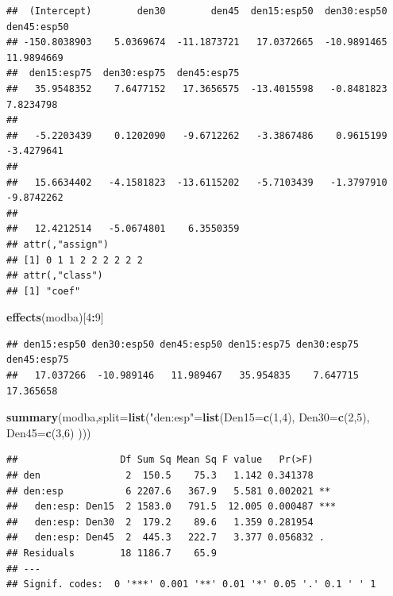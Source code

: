\documentclass[
]{book}
\newenvironment{Shaded}{\begin{snugshade}}{\end{snugshade}}
\newcommand{\DataTypeTok}[1]{\textcolor[rgb]{0.13,0.29,0.53}{#1}}
\newcommand{\DecValTok}[1]{\textcolor[rgb]{0.00,0.00,0.81}{#1}}
\newcommand{\KeywordTok}[1]{\textcolor[rgb]{0.13,0.29,0.53}{\textbf{#1}}}
\newcommand{\NormalTok}[1]{#1}
\newcommand{\OperatorTok}[1]{\textcolor[rgb]{0.81,0.36,0.00}{\textbf{#1}}}
\newcommand{\StringTok}[1]{\textcolor[rgb]{0.31,0.60,0.02}{#1}}
\begin{document}
\begin{verbatim}
##  (Intercept)        den30        den45  den15:esp50  den30:esp50  den45:esp50 
## -150.8038903    5.0369674  -11.1873721   17.0372665  -10.9891465   11.9894669 
##  den15:esp75  den30:esp75  den45:esp75                                        
##   35.9548352    7.6477152   17.3656575  -13.4015598   -0.8481823    7.8234798 
##                                                                               
##   -5.2203439    0.1202090   -9.6712262   -3.3867486    0.9615199   -3.4279641 
##                                                                               
##   15.6634402   -4.1581823  -13.6115202   -5.7103439   -1.3797910   -9.8742262 
##                                        
##   12.4212514   -5.0674801    6.3550359 
## attr(,"assign")
## [1] 0 1 1 2 2 2 2 2 2
## attr(,"class")
## [1] "coef"
\end{verbatim}

\begin{Shaded}
\begin{Highlighting}[]
\KeywordTok{effects}\NormalTok{(modba)[}\DecValTok{4}\OperatorTok{:}\DecValTok{9}\NormalTok{]}
\end{Highlighting}
\end{Shaded}

\begin{verbatim}
## den15:esp50 den30:esp50 den45:esp50 den15:esp75 den30:esp75 den45:esp75 
##   17.037266  -10.989146   11.989467   35.954835    7.647715   17.365658
\end{verbatim}

\begin{Shaded}
\begin{Highlighting}[]
\KeywordTok{summary}\NormalTok{(modba,}\DataTypeTok{split=}\KeywordTok{list}\NormalTok{(}\StringTok{"den:esp"}\NormalTok{=}\KeywordTok{list}\NormalTok{(}\DataTypeTok{Den15=}\KeywordTok{c}\NormalTok{(}\DecValTok{1}\NormalTok{,}\DecValTok{4}\NormalTok{),}
                                        \DataTypeTok{Den30=}\KeywordTok{c}\NormalTok{(}\DecValTok{2}\NormalTok{,}\DecValTok{5}\NormalTok{),}
                                        \DataTypeTok{Den45=}\KeywordTok{c}\NormalTok{(}\DecValTok{3}\NormalTok{,}\DecValTok{6}\NormalTok{)}
\NormalTok{                                                ))) }
\end{Highlighting}
\end{Shaded}

\begin{verbatim}
##                  Df Sum Sq Mean Sq F value   Pr(>F)    
## den               2  150.5    75.3   1.142 0.341378    
## den:esp           6 2207.6   367.9   5.581 0.002021 ** 
##   den:esp: Den15  2 1583.0   791.5  12.005 0.000487 ***
##   den:esp: Den30  2  179.2    89.6   1.359 0.281954    
##   den:esp: Den45  2  445.3   222.7   3.377 0.056832 .  
## Residuals        18 1186.7    65.9                     
## ---
## Signif. codes:  0 '***' 0.001 '**' 0.01 '*' 0.05 '.' 0.1 ' ' 1
\end{verbatim}
\end{document}
